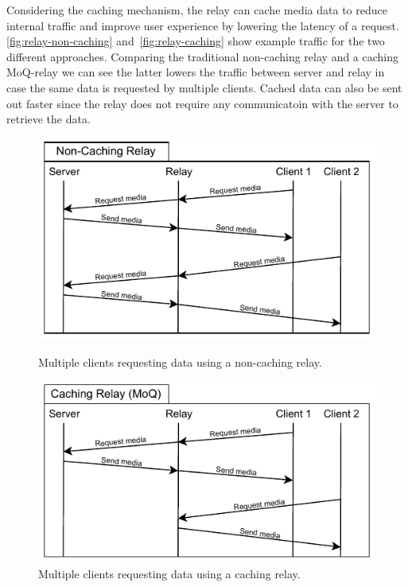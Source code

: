 Considering the caching mechanism, the relay can cache media data to reduce internal traffic 
and improve user experience by lowering the latency of a request.
\autoref{fig:relay-non-caching} and~\autoref{fig:relay-caching} show example traffic for the 
two different approaches.
Comparing the traditional non-caching relay and a caching MoQ-relay we can see the latter lowers 
the traffic between server and relay in case the same data is requested by multiple clients.
Cached data can also be sent out faster since the relay does not require any communicatoin with 
the server to retrieve the data.

\vspace{0.5cm}
\begin{figure}[H]

    \begin{minipage}{\textwidth}
        \centering
        \includegraphics[width=0.6\linewidth]{figures/02_background/relay-non-caching.drawio.pdf}
        \caption[Request to non-caching relay]{Multiple clients requesting data using a non-caching relay.}\label{fig:relay-non-caching}
    \end{minipage}\hfill

    \vspace{0.5cm}
    
    \begin{minipage}{\textwidth}
        \centering
        \includegraphics[width=0.6\linewidth]{figures/02_background/relay-caching.drawio.pdf}
        \caption[Request to caching relay]{Multiple clients requesting data using a caching relay.}\label{fig:relay-caching}
    \end{minipage}
    
\end{figure}

